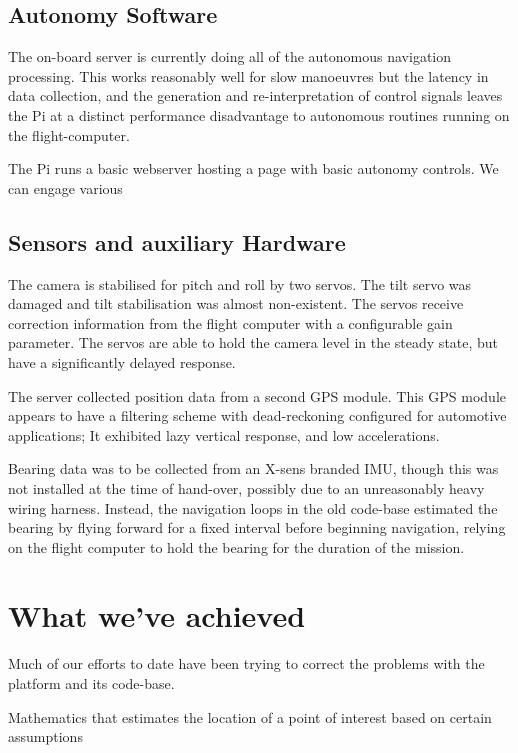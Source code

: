 \documentclass[11pt]{article}
\begin{document}
    \subsection{Autonomy Software}
      The on-board server is currently doing all of the autonomous navigation processing.  This works reasonably well for slow manoeuvres but the latency in data collection, and the generation and re-interpretation of control signals leaves the Pi at a distinct performance disadvantage to autonomous routines running on the flight-computer.

      The Pi runs a basic webserver hosting a page with basic autonomy controls. We can engage various

    \subsection{Sensors and auxiliary Hardware}
      The camera is stabilised for pitch and roll by two servos. The tilt servo was damaged and tilt stabilisation was almost non-existent.  The servos receive correction information from the flight computer with a configurable gain parameter.  The servos are able to hold the camera level in the steady state, but have a significantly delayed response.

      The server collected position data from a second GPS module.  This GPS module appears to have a filtering scheme with dead-reckoning configured for automotive applications; It exhibited lazy vertical response, and low accelerations.

      Bearing data was to be collected from an X-sens branded IMU, though this was not installed at the time of hand-over, possibly due to an unreasonably heavy wiring harness.  Instead, the navigation loops in the old code-base estimated the bearing by flying forward for a fixed interval before beginning navigation, relying on the flight computer to hold the bearing for the duration of the mission.


  \section{What we've achieved}

    Much of our efforts to date have been trying to correct the problems with the platform and its code-base. %

    Mathematics that estimates the location of a point of interest based on certain assumptions
\end{document}
